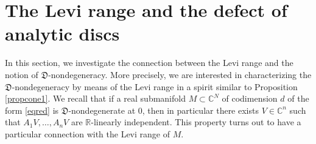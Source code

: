 \documentclass[12pt]{amsart}
\newcommand{\C}{\mathbb C}
\newcommand{\R}{\mathbb R}
\theoremstyle{remark}
\theoremstyle{example}
\theoremstyle{definition}
\numberwithin{equation}{section}
\begin{document}
\section{The Levi range and the defect of analytic discs}\label{sec2}

In this section, we investigate the connection between the Levi range and the notion of $\mathfrak{D}$-nondegeneracy. More precisely, we are interested in characterizing the $\mathfrak{D}$-nondegeneracy by means of the Levi range in a spirit similar to Proposition \ref{propcone1}. We recall that if a real submanifold $M \subset \C^N$ of codimension $d$ of the form \eqref{eqred} is  $\mathfrak{D}$-nondegenerate at $0$, then in particular there exists $V \in \C^n$ such that $A_1V,\ldots,A_nV$ are $\R$-linearly independent. This property turns out to have a particular connection with the Levi range of $M$.    
\end{document}
